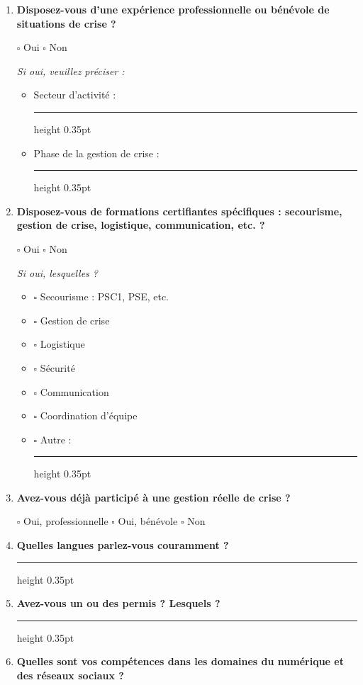 \documentclass[12pt,a4paper]{article}
\newcommand{\Case}{\(\square\)}
\newcommand{\Ligne}{\leavevmode\leaders\hrule height 0.35pt\hfill\kern0pt}
\newcommand{\Question}[1]{\item \textbf{#1}\par\vspace{0.1em}}
\newcommand{\Consigne}[1]{\par{\small\itshape #1}\par}
\begin{document}
\begin{enumerate}[label=\textbf{\arabic*.},leftmargin=0pt,itemindent=1.9em,labelwidth=1.4em,labelsep=0.5em,resume]

\Question{Disposez-vous d'une expérience professionnelle ou bénévole de situations de crise ?}

\Case{} Oui \hspace{1cm} \Case{} Non

\Consigne{Si oui, veuillez préciser :}

\begin{itemize}[leftmargin=1.5cm]
    \item Secteur d'activité : \Ligne
    \item Phase de la gestion de crise : \Ligne
\end{itemize}

\Question{Disposez-vous de formations certifiantes spécifiques : secourisme, gestion de crise, logistique, communication, etc. ?}

\Case{} Oui \hspace{1cm} \Case{} Non

\Consigne{Si oui, lesquelles ?}

\begin{itemize}[leftmargin=1.5cm]
    \item[] \Case{} Secourisme : PSC1, PSE, etc.
    \item[] \Case{} Gestion de crise
    \item[] \Case{} Logistique
    \item[] \Case{} Sécurité
    \item[] \Case{} Communication
    \item[] \Case{} Coordination d'équipe
    \item[] \Case{} Autre : \Ligne
\end{itemize}

\Question{Avez-vous déjà participé à une gestion réelle de crise ?}

\Case{} Oui, professionnelle \hspace{1cm} \Case{} Oui, bénévole \hspace{1cm} \Case{} Non

\Question{Quelles langues parlez-vous couramment ?}

\Ligne

\Question{Avez-vous un ou des permis ? Lesquels ?}

\Ligne

\Question{Quelles sont vos compétences dans les domaines du numérique et des réseaux sociaux ?}


\end{enumerate}
\end{document}
